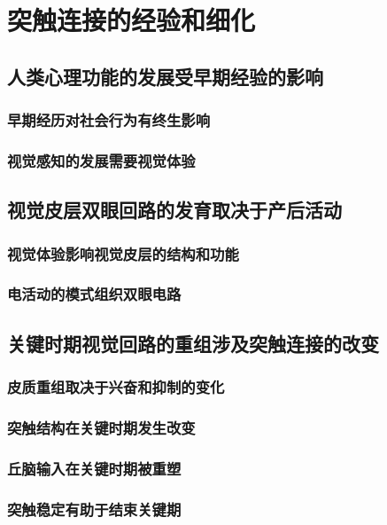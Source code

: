 \chapter{突触连接的经验和细化}

\section{人类心理功能的发展受早期经验的影响}
\subsection{早期经历对社会行为有终生影响}
\subsection{视觉感知的发展需要视觉体验}

\section{视觉皮层双眼回路的发育取决于产后活动}
\subsection{视觉体验影响视觉皮层的结构和功能}
\subsection{电活动的模式组织双眼电路}

\section{关键时期视觉回路的重组涉及突触连接的改变}
\subsection{皮质重组取决于兴奋和抑制的变化}
\subsection{突触结构在关键时期发生改变}
\subsection{丘脑输入在关键时期被重塑}
\subsection{突触稳定有助于结束关键期}

